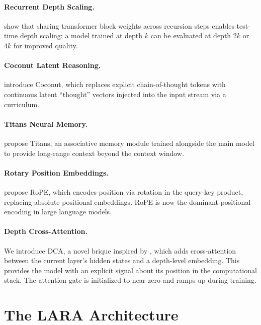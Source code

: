 \documentclass{article}
\begin{document}
\paragraph{Recurrent Depth Scaling.}
\citet{geiping2025scalingrecurrentdepth} show that sharing transformer block weights across recursion steps enables test-time depth scaling: a model trained at depth $k$ can be evaluated at depth $2k$ or $4k$ for improved quality.

\paragraph{Coconut Latent Reasoning.}
\citet{hao2024traininglargelanguagemodels} introduce Coconut, which replaces explicit chain-of-thought tokens with continuous latent ``thought'' vectors injected into the input stream via a curriculum.

\paragraph{Titans Neural Memory.}
\citet{behrouz2024titanslongtermmemory} propose Titans, an associative memory module trained alongside the main model to provide long-range context beyond the context window.

\paragraph{Rotary Position Embeddings.}
\citet{su2021roformerenhancedtransformerrotary} propose RoPE, which encodes position via rotation in the query-key product, replacing absolute positional embeddings. RoPE is now the dominant positional encoding in large language models.

\paragraph{Depth Cross-Attention.}
We introduce DCA, a novel brique inspired by \citet{dreamer2025}, which adds cross-attention between the current layer's hidden states and a depth-level embedding. This provides the model with an explicit signal about its position in the computational stack. The attention gate is initialized to near-zero and ramps up during training.

\section{The LARA Architecture}
\end{document}
